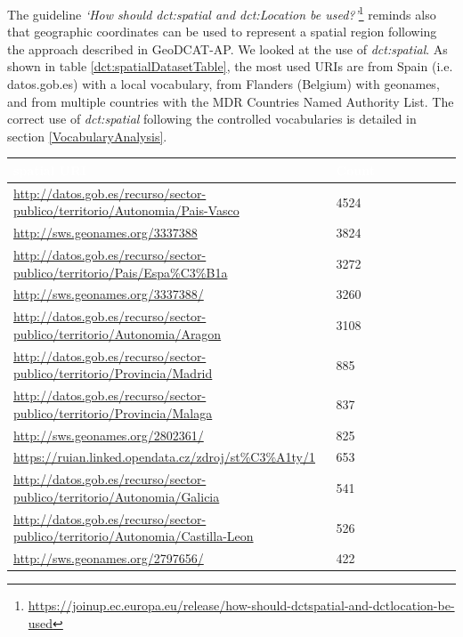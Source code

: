\documentclass[<options>]{elsarticle}
\begin{document}
The guideline \textit{‘How should dct:spatial and dct:Location be used?’}\footnote{\href{  https://joinup.ec.europa.eu/release/how-should-dctspatial-and-dctlocation-be-used}{  https://joinup.ec.europa.eu/release/how-should-dctspatial-and-dctlocation-be-used}} reminds also that geographic coordinates can be used to represent a spatial region following the approach described in GeoDCAT-AP. We looked at the use of \textit{dct:spatial}. As shown in table \ref{dct:spatialDatasetTable}, the most used URIs are from Spain (i.e. datos.gob.es) with a local vocabulary, from Flanders (Belgium) with geonames, and from multiple countries with the MDR Countries Named Authority List. The correct use of \textit{dct:spatial} following the controlled vocabularies is detailed in section \ref{VocabularyAnalysis}. 

\begin{longtable}{*8l}
\rowcolor{blue!90}
\textcolor{white}{\textbf{spatial URI}} & \textcolor{white}{\textbf{Count}} \\ \hline
\rowcolor{gray!10} \url{http://datos.gob.es/recurso/sector-publico/territorio/Autonomia/Pais-Vasco} &4524 \\ \hline
\rowcolor{gray!10} \url{http://sws.geonames.org/3337388} &3824 \\ \hline
\rowcolor{gray!10} \url{http://datos.gob.es/recurso/sector-publico/territorio/Pais/Espa\%C3\%B1a} &3272 \\ \hline
\rowcolor{gray!10} \url{http://sws.geonames.org/3337388/} &3260 \\ \hline
\rowcolor{gray!10} \url{http://datos.gob.es/recurso/sector-publico/territorio/Autonomia/Aragon} &3108 \\ \hline
\rowcolor{gray!10} \url{http://datos.gob.es/recurso/sector-publico/territorio/Provincia/Madrid} &885 \\ \hline
\rowcolor{gray!10} \url{http://datos.gob.es/recurso/sector-publico/territorio/Provincia/Malaga} &837\\ \hline
\rowcolor{gray!10} \url{http://sws.geonames.org/2802361/} &825\\ \hline
\rowcolor{gray!10} \url{https://ruian.linked.opendata.cz/zdroj/st\%C3\%A1ty/1} &653\\ \hline
\rowcolor{gray!10} \url{http://datos.gob.es/recurso/sector-publico/territorio/Autonomia/Galicia} &541\\ \hline
\rowcolor{gray!10} \url{http://datos.gob.es/recurso/sector-publico/territorio/Autonomia/Castilla-Leon } &526\\ \hline
\rowcolor{gray!10} \url{http://sws.geonames.org/2797656/ } &422\\ \hline

\end{longtable}
\end{document}
